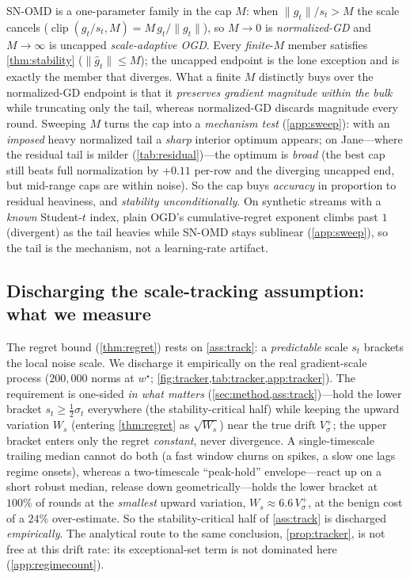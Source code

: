 \documentclass{article}
\newcommand{\norm}[1]{\lVert #1 \rVert}
\newcommand{\gt}{g_t}
\newcommand{\clip}{\operatorname{clip}}
\begin{document}
SN-OMD is a one-parameter family in the cap $M$: when $\norm{\gt}/s_t>M$ the scale cancels
($\clip(\gt/s_t,M)=M\,\gt/\norm{\gt}$), so $M\to0$ is \emph{normalized-GD} and $M\to\infty$ is
uncapped \emph{scale-adaptive OGD}. Every \emph{finite}-$M$ member satisfies \cref{thm:stability}
($\norm{\hat g_t}\le M$); the uncapped endpoint is the lone exception and is exactly the member
that diverges. What a finite $M$ distinctly buys over the normalized-GD endpoint is that it
\emph{preserves gradient magnitude within the bulk} while truncating only the tail, whereas
normalized-GD discards magnitude every round. Sweeping $M$ turns the cap into a \emph{mechanism
test} (\cref{app:sweep}): with an \emph{imposed} heavy normalized tail a \emph{sharp} interior
optimum appears; on Jane---where the residual tail is milder (\cref{tab:residual})---the optimum
is \emph{broad} (the best cap still beats full normalization by ${+}0.11$ per-row and the
diverging uncapped end, but mid-range caps are within noise). So the cap buys \emph{accuracy} in
proportion to residual heaviness, and \emph{stability unconditionally}.
On synthetic streams with a \emph{known} Student-$t$ index, plain OGD's cumulative-regret
exponent climbs past $1$ (divergent) as the tail heavies while SN-OMD stays sublinear
(\cref{app:sweep}), so the tail is the mechanism, not a learning-rate artifact.

\subsection{Discharging the scale-tracking assumption: what we measure}
\label{sec:tracker}

The regret bound (\cref{thm:regret}) rests on \cref{ass:track}: a \emph{predictable} scale
$s_t$ brackets the local noise scale. We discharge it empirically on the real gradient-scale
process ($200{,}000$ norms at $w^\star$; \cref{fig:tracker,tab:tracker,app:tracker}). The
requirement is one-sided \emph{in what matters} (\cref{sec:method,ass:track})---hold the lower
bracket $s_t\ge\tfrac12\sigma_t$ everywhere (the stability-critical half) while keeping the
upward variation $W_s$ (entering \cref{thm:regret} as $\sqrt{W_s}$) near the true drift
$V_\sigma^+$; the upper bracket enters only the regret \emph{constant}, never divergence. A single-timescale
trailing median cannot do both (a fast window churns on spikes, a slow one lags regime
onsets), whereas a two-timescale ``peak-hold'' envelope---react up on a short robust median,
release down geometrically---holds the lower bracket at \emph{$100\%$} of rounds at the
\emph{smallest} upward variation, $W_s\approx6.6\,V_\sigma^+$, at the benign cost of a $24\%$
over-estimate. So the stability-critical half of \cref{ass:track} is discharged
\emph{empirically}. The analytical route to the same conclusion, \cref{prop:tracker}, is not
free at this drift rate: its exceptional-set term is not dominated here
(\cref{app:regimecount}).
\end{document}
